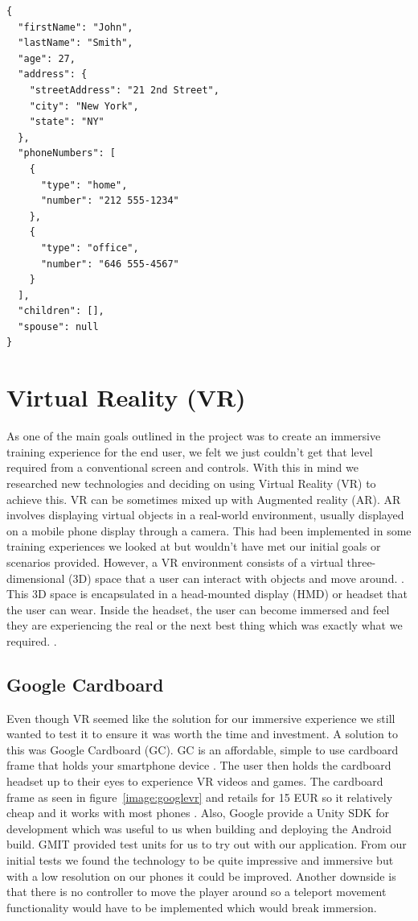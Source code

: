 \begin{lstlisting}[caption={JSON example.},label={lst:JSON}]
{
  "firstName": "John",
  "lastName": "Smith",
  "age": 27,
  "address": {
    "streetAddress": "21 2nd Street",
    "city": "New York",
    "state": "NY"
  },
  "phoneNumbers": [
    {
      "type": "home",
      "number": "212 555-1234"
    },
    {
      "type": "office",
      "number": "646 555-4567"
    }
  ],
  "children": [],
  "spouse": null
}
\end{lstlisting}

\section{Virtual Reality (VR)}
As one of the main goals outlined in the project was to create an immersive training experience for the end user, we felt we just couldn't get that level required from a conventional screen and controls. With this in mind we researched new technologies and deciding on using Virtual Reality (VR) to achieve this. VR can be sometimes mixed up with Augmented reality (AR). AR involves displaying virtual objects in a real-world environment, usually displayed on a mobile phone display through a camera. This had been implemented in some training experiences we looked at but wouldn't have met our initial goals or scenarios provided. However, a VR environment consists of a virtual three-dimensional (3D) space that a user can interact with objects and move around. \cite{isdale1998virtual}. This 3D space is encapsulated in a head-mounted display (HMD) or headset that the user can wear. Inside the headset, the user can become immersed and feel they are experiencing the real or the next best thing which was exactly what we required. \cite{isdale1998virtual}. 

\subsection{Google Cardboard}
Even though VR seemed like the solution for our immersive experience we still wanted to test it to ensure it was worth the time and investment. A solution to this was Google Cardboard (GC). GC is an affordable, simple to use cardboard frame that holds your smartphone device \cite{12335197120170501}. The user then holds the cardboard headset up to their eyes to experience VR videos and games. The cardboard frame as seen in figure~\ref{image:googlevr} and retails for 15 EUR so it relatively cheap and it works with most phones \cite{12335197120170501}. Also, Google provide a Unity SDK for development which was useful to us when building and deploying the Android build. GMIT provided test units for us to try out with our application. From our initial tests we found the technology to be quite impressive and immersive but with a low resolution on our phones it could be improved. Another downside is that there is no controller to move the player around so a teleport movement functionality would have to be implemented which would break immersion.

